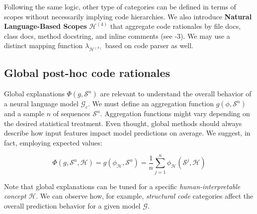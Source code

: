 Following the same logic, other type of categories can be defined in terms of scopes without necessarily implying code hierarchies. We also introduce \textbf{Natural Language-Based Scopes} $\mathcal{H}^{(4)}$ that aggregate code rationales by file docs, class docs, method docstring, and inline comments (see -3). We may use a distinct mapping function $\lambda_{\mathcal{H}^{(4)}}$ based on code parser as well. 

\subsection{Global post-hoc code rationales}

Global explanations $\Phi(g,\mathcal{S}^n)$ are relevant to understand the overall behavior of a neural language model $\mathcal{G}_c$. We must define an aggregation function $g(\phi,\mathcal{S}^n)$ and a sample $n$ of sequences $\mathcal{S}^n$. Aggregation functions might vary depending on the desired statistical treatment. Even thought, global methods should always describe how input features impact model predictions on average. We suggest, in fact, employing expected values:

\begin{equation}
\Phi(g,\mathcal{S}^n,\mathcal{H}) =  g(\phi_{\mathcal{H}},\mathcal{S}^n) = \frac{1}{n} \sum_{j=1}^{n} \phi_{\mathcal{H}}(\mathcal{S}^j,\mathcal{H})
\label{eq:aggregation}
\end{equation}

Note that global explanations can be tuned for a specific \textit{human-interpretable concept} $\mathcal{H}$. We can observe how, for example, \textit{structural code} categories affect the overall prediction behavior for a given model $\mathcal{G}$. 